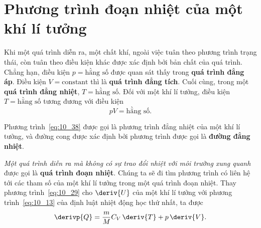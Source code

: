 \section{Phương trình đoạn nhiệt của một khí lí tưởng}\label{sec:10_10}


Khi một quá trình diễn ra, một chất khí, ngoài việc tuân theo phương trình trạng thái, còn tuân theo điều kiện khác được xác định bởi bản chất của quá trình. Chẳng hạn, điều kiện $p=\text{hằng số}$ được quan sát thấy trong \textbf{quá trình đẳng áp}. Điều kiện $V=\text{constant}$ thì là \textbf{quá trình đẳng tích}. Cuối cùng, trong một \textbf{quá trình đẳng nhiệt}, $T=\text{hằng số}$. Đối với một khí lí tưởng, điều kiện $T=\text{hằng số}$ tương đương với điều kiện
\begin{equation}\label{eq:10_38}
	pV = \text{hằng số}.
\end{equation}

\noindent

Phương trình~\eqref{eq:10_38} được gọi là phương trình đẳng nhiệt của một khí lí tưởng, và đường cong được xác định bởi phương trình được gọi là \textbf{đường đẳng nhiệt}.


\textit{Một quá trình diễn ra mà không có sự trao đổi nhiệt với môi trường xung quanh} được gọi là \textbf{quá trình đoạn nhiệt}. Chúng ta sẽ đi tìm phương trình có liên hệ tới các tham số của một khí lí tưởng trong một quá trình đoạn nhiệt. Thay phương trình~\eqref{eq:10_29} cho $\deriv{U}$ của một khí lí tưởng với phương trình~\eqref{eq:10_13} của định luật nhiệt động học thứ nhất, ta được
\begin{equation*}
	\derivp{Q} = \frac{m}{M}C_V\,\deriv{T} + p\,\deriv{V}.
\end{equation*}


